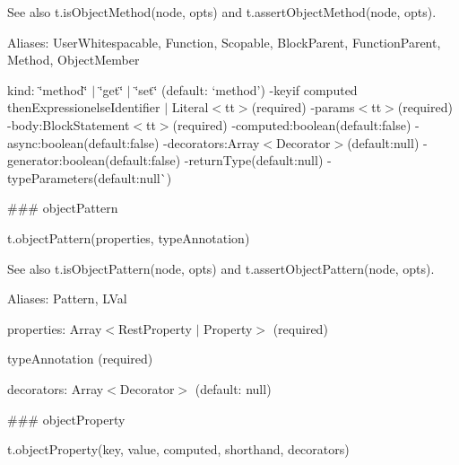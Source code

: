 See also {\ttfamily t.\+is\+Object\+Method(node, opts)} and {\ttfamily t.\+assert\+Object\+Method(node, opts)}.

Aliases\+: {\ttfamily User\+Whitespacable}, {\ttfamily Function}, {\ttfamily Scopable}, {\ttfamily Block\+Parent}, {\ttfamily Function\+Parent}, {\ttfamily Method}, {\ttfamily Object\+Member}


\begin{DoxyItemize}
\item {\ttfamily kind}\+: {\ttfamily \char`\"{}method\char`\"{} $\vert$ \char`\"{}get\char`\"{} $\vert$ \char`\"{}set\char`\"{}} (default\+: `\textquotesingle{}method'{\ttfamily ) -\/}key{\ttfamily if computed then}Expression{\ttfamily else}Identifier $\vert$ Literal$<$tt$>$(required) -\/params$<$tt$>$(required) -\/body{\ttfamily \+:}Block\+Statement$<$tt$>$(required) -\/computed{\ttfamily \+:}boolean{\ttfamily (default\+:}false{\ttfamily ) -\/}async{\ttfamily \+:}boolean{\ttfamily (default\+:}false{\ttfamily ) -\/}decorators{\ttfamily \+:}Array$<$\+Decorator$>${\ttfamily (default\+:}null{\ttfamily ) -\/}generator{\ttfamily \+:}boolean{\ttfamily (default\+:}false{\ttfamily ) -\/}return\+Type{\ttfamily (default\+:}null{\ttfamily ) -\/}type\+Parameters{\ttfamily (default\+:}null\`{}) 


\end{DoxyItemize}

\#\#\# object\+Pattern 
\begin{DoxyCode}
t.objectPattern(properties, typeAnnotation)
\end{DoxyCode}


See also {\ttfamily t.\+is\+Object\+Pattern(node, opts)} and {\ttfamily t.\+assert\+Object\+Pattern(node, opts)}.

Aliases\+: {\ttfamily Pattern}, {\ttfamily L\+Val}


\begin{DoxyItemize}
\item {\ttfamily properties}\+: {\ttfamily Array$<$Rest\+Property $\vert$ Property$>$} (required)
\item {\ttfamily type\+Annotation} (required)
\item {\ttfamily decorators}\+: {\ttfamily Array$<$Decorator$>$} (default\+: {\ttfamily null}) 


\end{DoxyItemize}

\#\#\# object\+Property 
\begin{DoxyCode}
t.objectProperty(key, value, computed, shorthand, decorators)
\end{DoxyCode}


